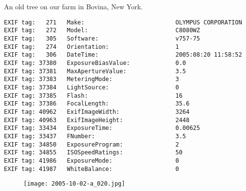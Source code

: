 \section{\protect{}}
\noindent An old tree on our farm in Bovina, New York.
\noindent
\begin{lstlisting}
EXIF tag:   271   Make:                          OLYMPUS CORPORATION
EXIF tag:   272   Model:                         C8080WZ
EXIF tag:   305   Software:                      v757-75
EXIF tag:   274   Orientation:                   1
EXIF tag:   306   DateTime:                      2005:08:20 11:58:52
EXIF tag: 37380   ExposureBiasValue:             0.0
EXIF tag: 37381   MaxApertureValue:              3.5
EXIF tag: 37383   MeteringMode:                  3
EXIF tag: 37384   LightSource:                   0
EXIF tag: 37385   Flash:                         16
EXIF tag: 37386   FocalLength:                   35.6
EXIF tag: 40962   ExifImageWidth:                3264
EXIF tag: 40963   ExifImageHeight:               2448
EXIF tag: 33434   ExposureTime:                  0.00625
EXIF tag: 33437   FNumber:                       3.5
EXIF tag: 34850   ExposureProgram:               2
EXIF tag: 34855   ISOSpeedRatings:               50
EXIF tag: 41986   ExposureMode:                  0
EXIF tag: 41987   WhiteBalance:                  0

\end{lstlisting}
\clearpage
\begin{figure}
\raggedleft
\texttt{[image: 2005-10-02-a\_020.jpg]}
\end{figure}

